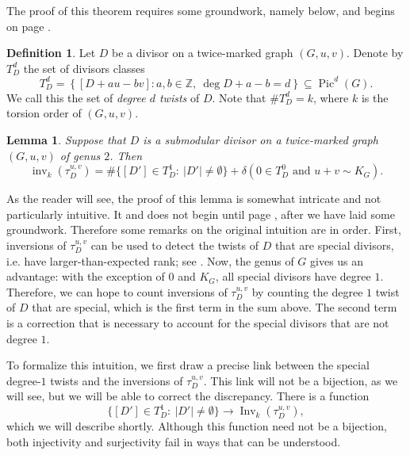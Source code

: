 \documentclass[11pt]{article}
\newtheorem{lemma}[theo]{Lemma}
\theoremstyle{definition}
\newtheorem{defi}[theo]{Definition}
\numberwithin{equation}{section}
\newcommand{\Z}{\mathbb{Z}}
\newcommand{\Inv}{\operatorname{Inv}}
\newcommand{\inv}{\operatorname{inv}}
\newcommand{\tauD}{\tau^{u,v}_D}
\newcommand{\Pic}{\operatorname{Pic}}
\begin{document}
The proof of this theorem requires some groundwork, namely  below, and begins on page \pageref{proof:kgtThetas}.

\begin{defi}
Let $D$ be a divisor on a twice-marked graph $(G,u,v)$. Denote by $T^d_D$ the set of divisors classes
$$T^d_{D} = \left\{ [D + a u - bv]: a,b \in \Z,\ \deg D + a - b = d \right\} \subseteq \Pic^d(G).$$
We call this the set of \emph{degree $d$ twists} of $D$. Note that $\#T^d_D = k$, where $k$ is the torsion order of $(G,u,v)$.
\end{defi}

\begin{lemma}
\label{lem:invtau}
Suppose that $D$ is a submodular divisor on a twice-marked graph $(G,u,v)$ of genus $2$. Then
$$\inv_k (\tau_D^{u,v}) = 
\# \{ [D'] \in T^1_D:\ |D'| \neq \emptyset \} + \delta( 0 \in T^0_D \mbox{ and } u+v \sim K_G).$$
\end{lemma}

As the reader will see, the proof of this lemma is somewhat intricate and not particularly intuitive. It and does not begin until page \pageref{proof:invtau}, after we have laid some groundwork. Therefore some remarks on the original intuition are in order. First, inversions of $\tauD$ can be used to detect the twists of $D$ that are special divisors, i.e. have larger-than-expected rank; see . Now, the genus of $G$ gives us an advantage: with the exception of $0$ and $K_G$, all special divisors have degree $1$. Therefore, we can hope to count inversions of $\tauD$ by counting the degree $1$ twist of $D$ that are special, which is the first term in the sum above. The second term is a correction that is necessary to account for the special divisors that are not degree $1$.

To formalize this intuition, we first draw a precise link between the special degree-$1$ twists and the inversions of $\tauD$. This link will not be a bijection, as we will see, but we will be able to correct the discrepancy. 
There is a function
$$\{ [D'] \in T^1_D:\ |D'| \neq \emptyset \} \to \Inv_k(\tauD),$$
which we will describe shortly. Although this function need not be a bijection, both injectivity and surjectivity fail in ways that can be understood.
\end{document}
